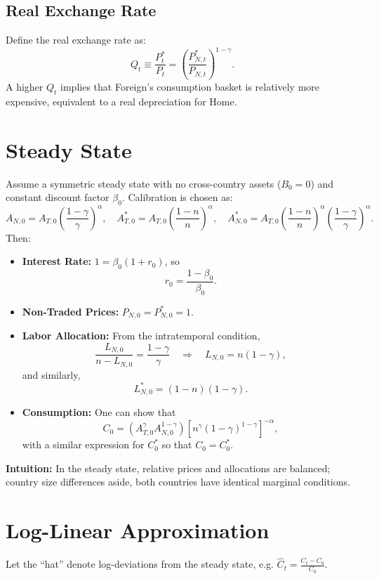 \documentclass[a4paper,12pt]{article} %
\theoremstyle{nonitalic}
\begin{document}
\subsection*{Real Exchange Rate}
Define the real exchange rate as:
\[
Q_t \equiv \frac{P^*_t}{P_t} = \left(\frac{P^*_{N,t}}{P_{N,t}}\right)^{1-\gamma}.
\]
A higher \( Q_t \) implies that Foreign’s consumption basket is relatively more expensive, equivalent to a real depreciation for Home.

\section{Steady State}

Assume a symmetric steady state with no cross-country assets (\( B_0=0 \)) and constant discount factor \( \beta_0 \). Calibration is chosen as:
\[
A_{N,0} = A_{T,0}\left(\frac{1-\gamma}{\gamma}\right)^{\alpha}, \quad
A^*_{T,0} = A_{T,0}\left(\frac{1-n}{n}\right)^{\alpha}, \quad
A^*_{N,0} = A_{T,0}\left(\frac{1-n}{n}\right)^{\alpha}\left(\frac{1-\gamma}{\gamma}\right)^{\alpha}.
\]
Then:
\begin{itemize}
    \item \textbf{Interest Rate:} \( 1 = \beta_0(1+r_0) \), so
    \[
    r_0 = \frac{1-\beta_0}{\beta_0}.
    \]
    \item \textbf{Non-Traded Prices:} \( P_{N,0} = P^*_{N,0} = 1 \).
    \item \textbf{Labor Allocation:} From the intratemporal condition, 
    \[
    \frac{L_{N,0}}{n-L_{N,0}} = \frac{1-\gamma}{\gamma} \quad \Rightarrow \quad L_{N,0} = n(1-\gamma),
    \]
    and similarly, 
    \[
    L^*_{N,0} = (1-n)(1-\gamma).
    \]
    \item \textbf{Consumption:} One can show that
    \[
    C_0 = \left(A_{T,0}^{\gamma}A_{N,0}^{1-\gamma}\right)\left[n^{\gamma}(1-\gamma)^{1-\gamma}\right]^{-\alpha},
    \]
    with a similar expression for \( C^*_0 \) so that \( C_0 = C^*_0 \).
\end{itemize}

\textbf{Intuition:} In the steady state, relative prices and allocations are balanced; country size differences aside, both countries have identical marginal conditions.

\section{Log-Linear Approximation}

Let the ``hat'' denote log-deviations from the steady state, e.g. \( \hat{C}_t = \frac{C_t-C_0}{C_0} \).
\end{document}
